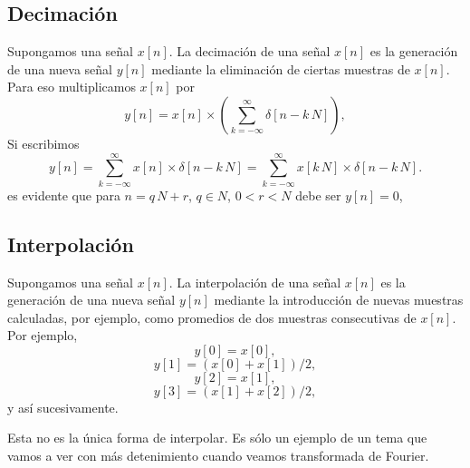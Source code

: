 
\subsection{Decimación}

Supongamos una señal $x[n]$. La decimación de una señal $x[n]$ es la generación de una nueva señal $y[n]$ mediante la eliminación de ciertas muestras de $x[n]$. 
Para eso multiplicamos $x[n]$ por
\begin{equation}
	y[n] = x[n] \times \left( \sum_{k=-\infty}^{\infty} \delta[n - k \, N]\right),
\end{equation}
Si escribimos
\begin{equation}
	y[n] = \sum_{k=-\infty}^{\infty} x[n] \times \delta[n - k \, N] =
	\sum_{k=-\infty}^{\infty} x[k \, N] \times \delta[n - k \, N].
\end{equation}
es evidente que para $n = q \, N + r$, $q \in N$, $0 < r < N$ debe ser $y[n] = 0$, 

\subsection{Interpolación}

Supongamos una señal $x[n]$. La interpolación de una señal $x[n]$ es la generación de una nueva señal $y[n]$ mediante la introducción de nuevas muestras 
calculadas, por ejemplo, como promedios de dos muestras consecutivas de $x[n]$. Por ejemplo,
\begin{equation}
	y[0] = x[0],
\end{equation}
\begin{equation}
	y[1] = (x[0] + x[1]) / 2,
\end{equation}
\begin{equation}
	y[2] = x[1],
\end{equation}
\begin{equation}
	y[3] = (x[1] + x[2]) / 2,
\end{equation}
y así sucesivamente.

Esta no es la única forma de interpolar. Es sólo un ejemplo de un tema que vamos a ver con más detenimiento cuando veamos transformada de Fourier.

